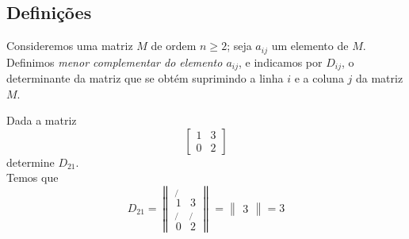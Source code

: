 \subsection{Definições}
\begin{df}
Consideremos uma matriz $M$ de ordem $n\ge 2$; seja $a_{ij}$ um elemento de $M$. Definimos \emph{menor complementar do elemento $a_{ij}$}, e indicamos por $D_{ij}$, o determinante da matriz que se obtém suprimindo a linha $i$ e a coluna $j$ da matriz $M$.
\end{df}
\begin{exemplo}
Dada a matriz \[\begin{bmatrix}
1 & 3 \\
0 & 2
\end{bmatrix}\] determine $D_{21}$. \\ Temos que
\[D_{21}=\begin{Vmatrix}
\not{1} & 3 \\
\not{0} & \not{2}
\end{Vmatrix}=\begin{Vmatrix}
3
\end{Vmatrix}=3\]
\end{exemplo}

